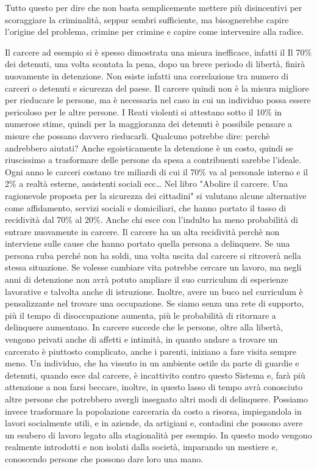 \documentclass[12pt]{book} %
\begin{document}
Tutto questo per dire che non basta semplicemente mettere più disincentivi per scoraggiare la criminalità, seppur sembri sufficiente, ma bisognerebbe capire l'origine del problema, crimine per crimine e capire come intervenire alla radice.

Il carcere ad esempio si è spesso dimostrata una misura inefficace, infatti il Il 70\% dei detenuti, una volta scontata la pena, dopo un breve periodo di libertà, finirà nuovamente in detenzione. Non esiste infatti una correlazione tra numero di carceri o detenuti e sicurezza del paese. Il carcere quindi non è la misura migliore per rieducare le persone, ma è necessaria nel caso in cui un individuo possa essere pericoloso per le altre persone.
I Reati violenti si attestano sotto il 10\% in numerose stime, quindi per la maggioranza dei detenuti è possibile pensare a misure che possano davvero rieducarli.
Qualcuno potrebbe dire: perchè andrebbero aiutati? Anche egoisticamente la detenzione è un costo, quindi se riuscissimo a trasformare delle persone da spesa a contribuenti sarebbe l'ideale. Ogni anno le carceri costano tre miliardi di cui il 70\% va al personale interno e il 2\% a realtà esterne,
assistenti sociali ecc…
Nel libro "Abolire il carcere. Una ragionevole proposta per la sicurezza dei cittadini"  si valutano alcune alternative come affidamento, servizi sociali e domiciliari, che hanno portato il tasso
di recidività dal 70\% al 20\%. Anche chi esce con l'indulto ha meno probabilità di entrare nuovamente in carcere. 
Il carcere ha un alta recidività perchè non interviene sulle cause che hanno portato quella persona a delinquere.
Se una persona ruba perché non ha soldi, una volta uscita dal carcere si ritroverà nella stessa situazione.
Se volesse cambiare vita potrebbe cercare un lavoro, ma negli anni di detenzione non avrà potuto ampliare il suo curriculum di esperienze lavorative e talvolta anche di istruzione. Inoltre, avere un buco nel curriculum è pensalizzante nel trovare una occupazione. 
Se siamo senza una rete di supporto, più il tempo di disoccupazione aumenta, più le probabilità di ritornare a delinquere aumentano.
In carcere succede che le persone, oltre alla libertà, vengono privati anche di affetti e intimità, in quanto andare
a trovare un carcerato è piuttosto complicato, anche i parenti, iniziano a fare visita sempre meno. Un individuo, che ha vissuto in un ambiente ostile da parte di guardie e detenuti, quando esce dal carcere, è incattivito contro questo Sistema e, farà più attenzione a non farsi
beccare, inoltre, in questo lasso di tempo avrà conosciuto altre persone che potrebbero avergli insegnato altri modi di delinquere. 
Possiamo invece trasformare la popolazione carceraria da costo a risorsa, impiegandola in lavori socialmente utili, e in
aziende, da artigiani e, contadini che possono avere un esubero di lavoro legato alla stagionalità per esempio. In questo modo
vengono realmente introdotti e non isolati dalla società, imparando un mestiere e, conoscendo persone che possono dare loro una mano. 
\end{document}
